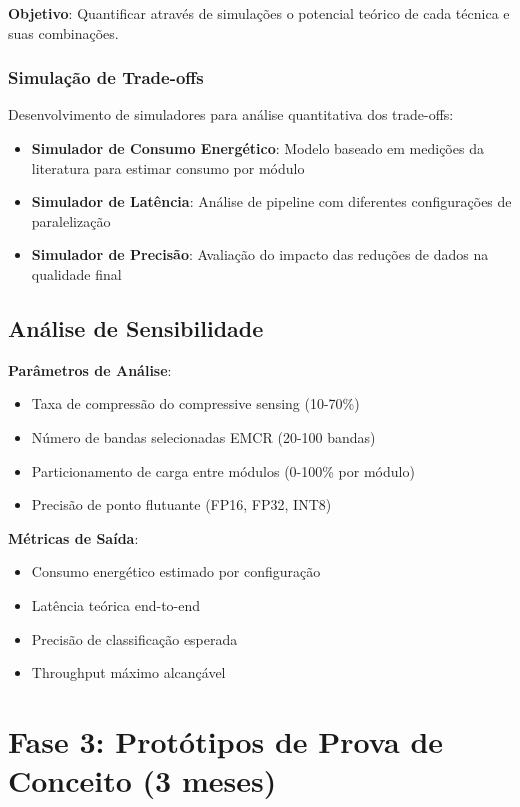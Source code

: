 \textbf{Objetivo}: Quantificar através de simulações o potencial teórico de cada técnica e suas combinações.

\subsubsection{Simulação de Trade-offs}

Desenvolvimento de simuladores para análise quantitativa dos trade-offs:

\begin{itemize}
\item \textbf{Simulador de Consumo Energético}: Modelo baseado em medições da literatura para estimar consumo por módulo
\item \textbf{Simulador de Latência}: Análise de pipeline com diferentes configurações de paralelização
\item \textbf{Simulador de Precisão}: Avaliação do impacto das reduções de dados na qualidade final
\end{itemize}

\subsection{Análise de Sensibilidade}

\textbf{Parâmetros de Análise}:
\begin{itemize}
\item Taxa de compressão do compressive sensing (10-70\%)
\item Número de bandas selecionadas EMCR (20-100 bandas)
\item Particionamento de carga entre módulos (0-100\% por módulo)
\item Precisão de ponto flutuante (FP16, FP32, INT8)
\end{itemize}

\textbf{Métricas de Saída}:
\begin{itemize}
\item Consumo energético estimado por configuração
\item Latência teórica end-to-end
\item Precisão de classificação esperada
\item Throughput máximo alcançável
\end{itemize}

\section{Fase 3: Protótipos de Prova de Conceito (3 meses)}


